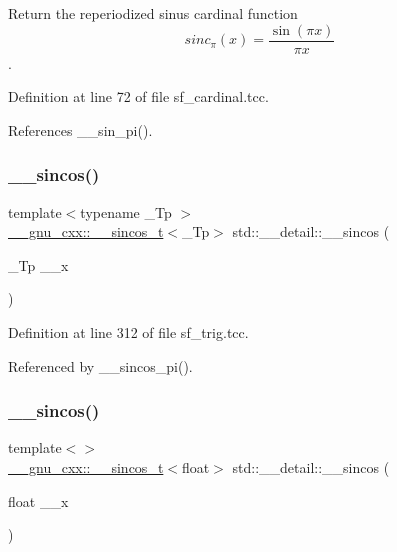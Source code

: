 Return the reperiodized sinus cardinal function \[ sinc_\pi(x) = \frac{\sin(\pi x)}{\pi x} \]. 



Definition at line 72 of file sf\+\_\+cardinal.\+tcc.



References \+\_\+\+\_\+sin\+\_\+pi().

\mbox{\label{namespacestd_1_1____detail_a59a9ff6922faa1a88da8b485ee9d37cb}} 
\subsubsection{\texorpdfstring{\+\_\+\+\_\+sincos()}{\_\_sincos()}\hspace{0.1cm}{\footnotesize\ttfamily [1/4]}}
{\footnotesize\ttfamily template$<$typename \+\_\+\+Tp $>$ \\
\hyperlink{struct____gnu__cxx_1_1____sincos__t}{\+\_\+\+\_\+gnu\+\_\+cxx\+::\+\_\+\+\_\+sincos\+\_\+t}$<$\+\_\+\+Tp$>$ std\+::\+\_\+\+\_\+detail\+::\+\_\+\+\_\+sincos (\begin{DoxyParamCaption}\item[{\+\_\+\+Tp}]{\+\_\+\+\_\+x }\end{DoxyParamCaption})\hspace{0.3cm}{\ttfamily [inline]}}



Definition at line 312 of file sf\+\_\+trig.\+tcc.



Referenced by \+\_\+\+\_\+sincos\+\_\+pi().

\mbox{\label{namespacestd_1_1____detail_a8cfd8b8345ebc359e31ac1631e29aeea}} 
\subsubsection{\texorpdfstring{\+\_\+\+\_\+sincos()}{\_\_sincos()}\hspace{0.1cm}{\footnotesize\ttfamily [2/4]}}
{\footnotesize\ttfamily template$<$$>$ \\
\hyperlink{struct____gnu__cxx_1_1____sincos__t}{\+\_\+\+\_\+gnu\+\_\+cxx\+::\+\_\+\+\_\+sincos\+\_\+t}$<$float$>$ std\+::\+\_\+\+\_\+detail\+::\+\_\+\+\_\+sincos (\begin{DoxyParamCaption}\item[{float}]{\+\_\+\+\_\+x }\end{DoxyParamCaption})\hspace{0.3cm}{\ttfamily [inline]}}



